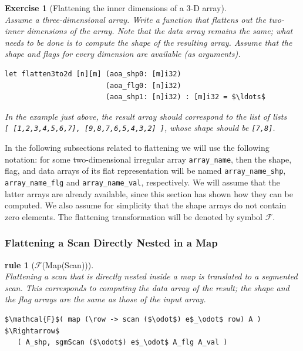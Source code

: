 \documentclass[acmsmall,review]{acmart}\settopmatter{printfolios=true,printccs=false,printacmref=false}
\newtheorem{myexerc}{Exercise}
\newtheorem{rewrite}{rule}
\begin{document}
\begin{myexerc}[Flattening the inner dimensions of a 3-D array]\label{Flat-Inner-Arr-Dim}
$\mbox{ }$\\
Assume a three-dimensional array. Write a function that flattens 
out the two-inner dimensions of the array. Note that the data
array remains the same; what needs to be done is to compute the
shape of the resulting array.  Assume that the shape and flags
for every dimension are available (as arguments).

\begin{lstlisting}[mathescape=true]
let flatten3to2d [n][m] (aoa_shp0: [m]i32) 
                        (aoa_flg0: [n]i32)
                        (aoa_shp1: [n]i32) : [m]i32 = $\ldots$
\end{lstlisting}\vspace{-2ex}

In the example just above, the result array should correspond to
the list of lists\\ {\tt [ [1,2,3,4,5,6,7], [9,8,7,6,5,4,3,2] ]},
whose shape should be {\tt [7,8]}.
\end{myexerc}

In the following subsections related to flattening we will use the
following notation: for some two-dimensional irregular array 
{\tt array\_name}, then the shape, flag, and data arrays of its 
flat representation will be named {\tt array\_name\_shp}, 
{\tt array\_name\_flg} and {\tt array\_name\_val}, respectively.
We will assume that the latter arrays are already available,
since this section has shown how they can be computed.
We also assume for simplicity that the shape arrays do not contain
zero elements.   
The flattening transformation will be denoted by symbol $\mathcal{F}$.\bigskip

\subsubsection{Flattening a Scan Directly Nested in a Map}
\label{subsubsec:scan-in-map} 

\begin{rewrite}[$\mathcal{F}$(Map(Scan))]\label{Flat-Scan-In-Map}
$\mbox{ }$\\
Flattening a scan that is directly nested inside a map is translated to a
segmented scan. This corresponds to computing the data array of the result; 
the shape and the flag arrays are the same as those of the input array.
\begin{lstlisting}[mathescape=true]
$\mathcal{F}$( map (\row -> scan ($\odot$) e$_\odot$ row) A ) $\Rightarrow$
   ( A_shp, sgmScan ($\odot$) e$_\odot$ A_flg A_val )
\end{lstlisting}\vspace{-2ex}
\end{rewrite}
\end{document}
